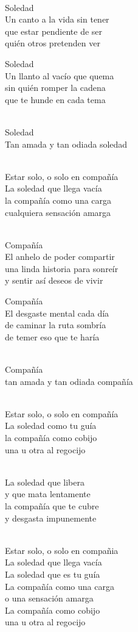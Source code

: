 \begin{lyrics}
\\
Soledad\\
Un canto a la vida sin tener\\
que estar pendiente de ser\\
quién otros pretenden ver

Soledad\\
Un llanto al vacío que quema\\
sin quién romper la cadena\\
que te hunde en cada tema

\\
Soledad\\
Tan amada y tan odiada soledad

\\
Estar solo, o solo en compañía\\
La soledad que llega vacía\\
la compañía como una carga\\
cualquiera sensación amarga

\\
Compañía\\
El anhelo de poder compartir\\
una linda historia para sonreír\\
y sentir así deseos de vivir

Compañía\\
El desgaste mental cada día\\
de caminar la ruta sombría\\
de temer eso que te haría

\\
Compañía\\
tan amada y tan odiada compañía

\\
Estar solo, o solo en compañía\\
La soledad como tu guía\\
la compañía como cobijo\\
una u otra al regocijo

\\
La soledad que libera\\
y que mata lentamente\\
la compañía que te cubre\\
y desgasta impunemente

\\
Estar solo, o solo en compañia\\
La soledad que llega vacía\\
La soledad que es tu guía\\
La compañía como una carga\\
o una sensación amarga\\
La compañía como cobijo\\
una u otra al regocijo
\end{lyrics}

